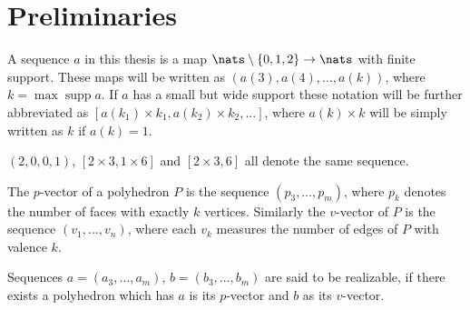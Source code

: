 \section{Preliminaries}

\begin{definition}[Sequence]
  A sequence $a$ in this thesis is a map $\nats \setminus \{0, 1, 2\} \rightarrow \nats$ with finite support. These maps will be written as $(a(3), a(4), ..., a(k))$, where $k = \operatorname{max} \operatorname{supp} a$. If $a$ has a small but wide support these notation will be further abbreviated as $[a(k_1) \times k_1, a(k_2) \times k_2, ...]$, where $a(k) \times k$ will be simply written as $k$ if $a(k) = 1$.
\end{definition}
\begin{example}
  $(2, 0, 0, 1)$, $[2 \times 3, 1 \times 6]$ and $[2 \times 3, 6]$ all denote the same sequence. 
\end{example}
\begin{definition}\label{def:relizable}
  The $p$-vector of a polyhedron $P$ is the sequence $(p_3, \dots, p_m)$, where $p_k$ denotes the number of faces with exactly $k$ vertices. Similarly the $v$-vector of $P$ is the sequence $(v_1, \dots, v_n)$, where each $v_k$ measures the number of edges of $P$ with valence $k$. 
\end{definition}

\begin{definition}
Sequences $a = (a_3, \dots, a_m)$, $b = (b_3, \dots, b_m)$ are said to be realizable, if there exists a polyhedron which has $a$ is its $p$-vector and $b$ as its $v$-vector.
\end{definition}


